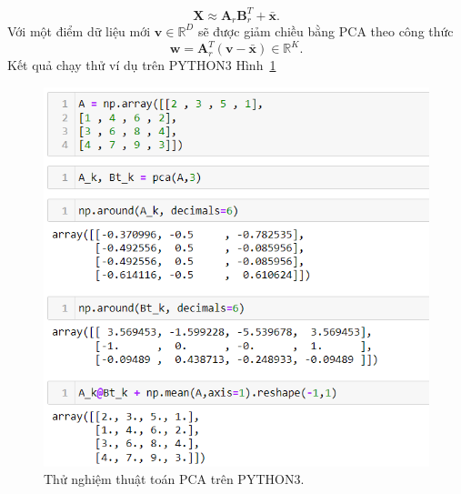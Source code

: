 \documentclass[12pt,a4paper,oneside]{report}
\numberwithin{equation}{section}
\def\R{\mathbb{R}}
\begin{document}
\begin{equation} 
	\mathbf{X} \approx \mathbf{A}_r\mathbf{B}_r^{T}+ \bar{\mathbf{x}} .
\end{equation} 
Với một điểm dữ liệu mới $\mathbf{v} \in \R^D$ sẽ
được giảm chiều bằng PCA theo công thức 
\begin{equation} \label{chieu}
	\mathbf{w} = \mathbf{A}_r^T(\mathbf{v} - \bar{\mathbf{x}}) \in
	\R^K .
\end{equation}
Kết quả chạy thử ví dụ trên PYTHON3 Hình~\ref{fig:pca_example}
%
%
\begin{figure}[htp]
	\centering
	\includegraphics[scale=0.8]{example_pca.png}
	\caption{Thử nghiệm thuật toán PCA trên PYTHON3.}
	\label{fig:pca_example}
\end{figure}
\end{document}
